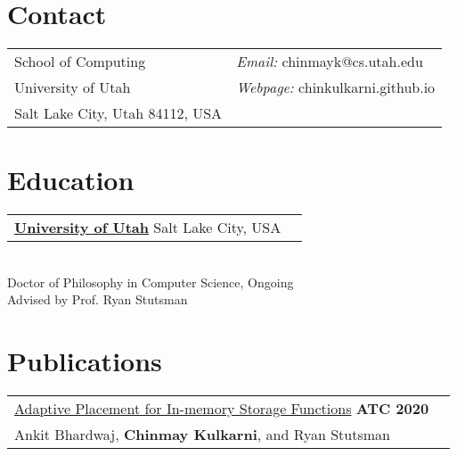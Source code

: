 \documentclass[margin,line]{res}
\begin{document}
\name{Chinmay Kulkarni\newline %
      {\small PhD Student, University of Utah}}
\begin{resume}
\section{\sc Contact}
 \begin{tabular}{@{}p{3.25in}p{4in}}
 School of Computing                             & {\it Email:  }  chinmayk@cs.utah.edu \\
 University of Utah                              & {\it Webpage:}  chinkulkarni.github.io \\
 Salt Lake City, Utah 84112, USA                 \\
 \end{tabular}


\section{\sc Education}
 \begin{tabular}{@{}p{5.5in}p{4in}}
  {\bf \href{http://www.cs.utah.edu/}{University of Utah}} \dotfill Salt Lake City,
  USA
 \end{tabular}
 \\ {\small Doctor of Philosophy in Computer Science, Ongoing}
 \\ {\small Advised by Prof. Ryan Stutsman}

\section{\sc Publications}
 \vspace{-2.5pt}
 \begin{tabular}{@{}p{5.5in}p{4in}}
 \href{http://utah.systems/projects/kulkarni\_splinter}{Adaptive
 Placement for In-memory Storage Functions} \hfill
 {\small\bf ATC 2020}\\
 {\small Ankit Bhardwaj, {\bf Chinmay Kulkarni}, and Ryan Stutsman}\\
 \end{tabular}


\end{resume}
\end{document}
